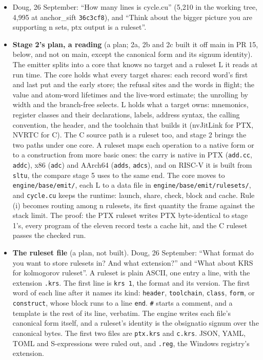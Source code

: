 \begin{enumerate}
\begin{itemize}
\begin{enumerate}
\begin{itemize}
\item Doug, 26 September: “How many lines is cycle.cu” (5,210 in the working tree, 4,995 at anchor\_\allowbreak{}sift \texttt{36c3cf8}), and “Think about the bigger picture you are supporting n sets, ptx output is a ruleset”.
\item \textbf{Stage 2's plan, a reading} (a plan; 2a, 2b and 2c built it off main in PR 15, below, and not on main, except the canonical form and its signum identity). The emitter splits into a core that knows no target and a ruleset L it reads at run time. The core holds what every target shares: each record word's first and last put and the early store; the refusal sites and the words in flight; the value and atom-word lifetimes and the live-word estimate; the unrolling by width and the branch-free selects. L holds what a target owns: mnemonics, register classes and their declarations, labels, address syntax, the calling convention, the header, and the toolchain that builds it (nvJitLink for PTX, NVRTC for C). The C source path is a ruleset too, and stage 2 brings the two paths under one core. A ruleset maps each operation to a native form or to a construction from more basic ones: the carry is native in PTX (\texttt{add.cc}, \texttt{addc}), x86 (\texttt{adc}) and AArch64 (\texttt{adds}, \texttt{adcs}), and on RISC-V it is built from \texttt{sltu}, the compare stage 5 uses to the same end. The core moves to \texttt{engine/\allowbreak{}base/\allowbreak{}emit/\allowbreak{}}, each L to a data file in \texttt{engine/\allowbreak{}base/\allowbreak{}emit/\allowbreak{}rulesets/\allowbreak{}}, and \texttt{cycle.\allowbreak{}cu} keeps the runtime: launch, share, check, block and cache. Rule (i) becomes routing among n rulesets, its first quantity the frame against the stack limit. The proof: the PTX ruleset writes PTX byte-identical to stage 1's, every program of the eleven record tests a cache hit, and the C ruleset passes the checked run.
\item \textbf{The ruleset file} (a plan, not built). Doug, 26 September: “What format do you want to store rulesets in? And what extension?” and “What about KRS for kolmogorov ruleset”. A ruleset is plain ASCII, one entry a line, with the extension \texttt{.\allowbreak{}krs}. The first line is \texttt{krs 1}, the format and its version. The first word of each line after it names its kind: \texttt{header}, \texttt{toolchain}, \texttt{class}, \texttt{form}, or \texttt{construct}, whose block runs to a line \texttt{end}. \texttt{\#} starts a comment, and a template is the rest of its line, verbatim. The engine writes each file's canonical form itself, and a ruleset's identity is the obsignatio signum over the canonical bytes. The first two files are \texttt{ptx.\allowbreak{}krs} and \texttt{c.\allowbreak{}krs}. JSON, YAML, TOML and S-expressions were ruled out, and \texttt{.\allowbreak{}reg}, the Windows registry's extension.

\end{itemize}
\end{enumerate}
\end{itemize}
\end{enumerate}
